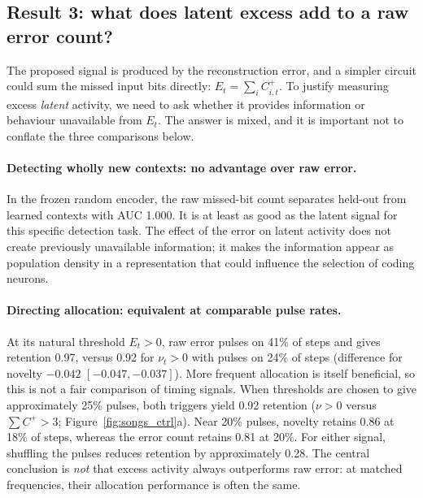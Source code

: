 \documentclass[11pt,a4paper]{article}
\begin{document}
\subsection{Result 3: what does latent excess add to a raw error count?}\label{sec:nu_vs_err}
The proposed signal is produced by the reconstruction error, and a simpler circuit could sum the missed input bits directly: $E_t=\sum_i C^+_{i,t}$. To justify measuring excess \emph{latent} activity, we need to ask whether it provides information or behaviour unavailable from $E_t$. The answer is mixed, and it is important not to conflate the three comparisons below.

\paragraph{Detecting wholly new contexts: no advantage over raw error.}
In the frozen random encoder, the raw missed-bit count separates held-out from learned contexts with AUC 1.000. It is at least as good as the latent signal for this specific detection task. The effect of the error on latent activity does not create previously unavailable information; it makes the information appear as population density in a representation that could influence the selection of coding neurons.

\paragraph{Directing allocation: equivalent at comparable pulse rates.}
At its natural threshold $E_t>0$, raw error pulses on 41\% of steps and gives retention 0.97, versus 0.92 for $\nu_t>0$ with pulses on 24\% of steps (difference for novelty $-0.042$ $[-0.047,-0.037]$). More frequent allocation is itself beneficial, so this is not a fair comparison of timing signals. When thresholds are chosen to give approximately 25\% pulses, both triggers yield 0.92 retention ($\nu>0$ versus $\sum C^+>3$; Figure~\ref{fig:songs_ctrl}a). Near 20\% pulses, novelty retains 0.86 at 18\% of steps, whereas the error count retains 0.81 at 20\%. For either signal, shuffling the pulses reduces retention by approximately 0.28. The central conclusion is \emph{not} that excess activity always outperforms raw error: at matched frequencies, their allocation performance is often the same.
\end{document}
